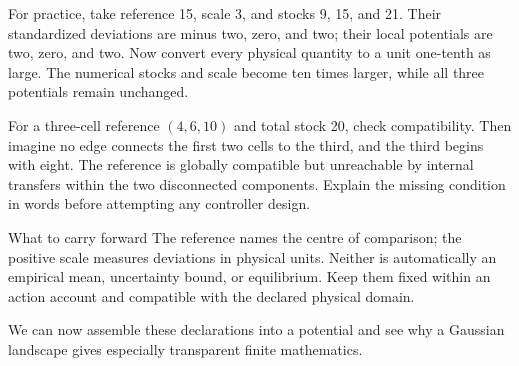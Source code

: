 For practice, take reference 15, scale 3, and stocks 9, 15, and 21. Their standardized deviations are minus two, zero, and two; their local potentials are two, zero, and two. Now convert every physical quantity to a unit one-tenth as large. The numerical stocks and scale become ten times larger, while all three potentials remain unchanged.

For a three-cell reference \((4,6,10)\) and total stock 20, check compatibility. Then imagine no edge connects the first two cells to the third, and the third begins with eight. The reference is globally compatible but unreachable by internal transfers within the two disconnected components. Explain the missing condition in words before attempting any controller design.

\begin{intuitionbox}{What to carry forward}
The reference names the centre of comparison; the positive scale measures deviations in physical units. Neither is automatically an empirical mean, uncertainty bound, or equilibrium. Keep them fixed within an action account and compatible with the declared physical domain.
\end{intuitionbox}

We can now assemble these declarations into a potential and see why a Gaussian landscape gives especially transparent finite mathematics.
